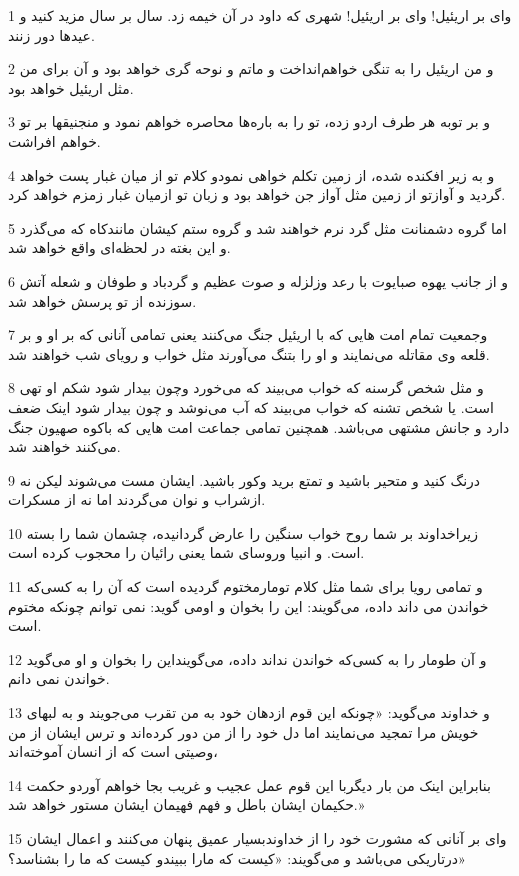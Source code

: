 \par 1 وای بر اریئیل! وای بر اریئیل! شهری که داود در آن خیمه زد. سال بر سال مزید کنید و عیدها دور زنند.
\par 2 و من اریئیل را به تنگی خواهم‌انداخت و ماتم و نوحه گری خواهد بود و آن برای من مثل اریئیل خواهد بود.
\par 3 و بر توبه هر طرف اردو زده، تو را به باره‌ها محاصره خواهم نمود و منجنیقها بر تو خواهم افراشت.
\par 4 و به زیر افکنده شده، از زمین تکلم خواهی نمودو کلام تو از میان غبار پست خواهد گردید و آوازتو از زمین مثل آواز جن خواهد بود و زبان تو ازمیان غبار زمزم خواهد کرد.
\par 5 اما گروه دشمنانت مثل گرد نرم خواهند شد و گروه ستم کیشان مانندکاه که می‌گذرد و این بغته در لحظه‌ای واقع خواهد شد.
\par 6 و از جانب یهوه صبایوت با رعد وزلزله و صوت عظیم و گردباد و طوفان و شعله آتش سوزنده از تو پرسش خواهد شد.
\par 7 وجمعیت تمام امت هایی که با اریئیل جنگ می‌کنند یعنی تمامی آنانی که بر او و بر قلعه وی مقاتله می‌نمایند و او را بتنگ می‌آورند مثل خواب و رویای شب خواهند شد.
\par 8 و مثل شخص گرسنه که خواب می‌بیند که می‌خورد وچون بیدار شود شکم او تهی است. یا شخص تشنه که خواب می‌بیند که آب می‌نوشد و چون بیدار شود اینک ضعف دارد و جانش مشتهی می‌باشد. همچنین تمامی جماعت امت هایی که باکوه صهیون جنگ می‌کنند خواهند شد.
\par 9 درنگ کنید و متحیر باشید و تمتع برید وکور باشید. ایشان مست می‌شوند لیکن نه ازشراب و نوان می‌گردند اما نه از مسکرات.
\par 10 زیراخداوند بر شما روح خواب سنگین را عارض گردانیده، چشمان شما را بسته است. و انبیا وروسای شما یعنی رائیان را محجوب کرده است.
\par 11 و تمامی رویا برای شما مثل کلام تومارمختوم گردیده است که آن را به کسی‌که خواندن می داند داده، می‌گویند: این را بخوان و اومی گوید: نمی توانم چونکه مختوم است.
\par 12 و آن طومار را به کسی‌که خواندن نداند داده، می‌گوینداین را بخوان و او می‌گوید خواندن نمی دانم.
\par 13 و خداوند می‌گوید: «چونکه این قوم ازدهان خود به من تقرب می‌جویند و به لبهای خویش مرا تمجید می‌نمایند اما دل خود را از من دور کرده‌اند و ترس ایشان از من وصیتی است که از انسان آموخته‌اند، 
\par 14 بنابراین اینک من بار دیگربا این قوم عمل عجیب و غریب بجا خواهم آوردو حکمت حکیمان ایشان باطل و فهم فهیمان ایشان مستور خواهد شد.»
\par 15 وای بر آنانی که مشورت خود را از خداوندبسیار عمیق پنهان می‌کنند و اعمال ایشان درتاریکی می‌باشد و می‌گویند: «کیست که مارا ببیندو کیست که ما را بشناسد؟»
